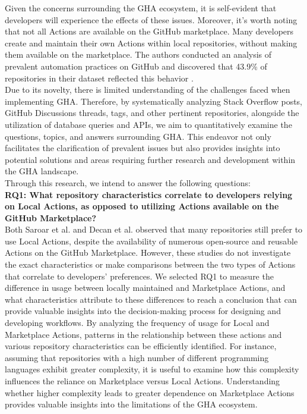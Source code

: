 \documentclass[conference]{IEEEtran}
\begin{document}
    Given the concerns surrounding the GHA ecosystem, it is self-evident that developers will experience the effects of these issues.  Moreover, it's worth noting that not all Actions are available on the GitHub marketplace. Many developers create and maintain their own Actions within local repositories, without making them available on the marketplace. The authors  conducted an analysis of prevalent automation practices on GitHub and discovered that 43.9\% of repositories in their dataset reflected this behavior \cite{decan2022use}.\\
    Due to its novelty, there is limited understanding of the challenges faced when implementing GHA.  
    Therefore,  by systematically analyzing Stack Overflow posts, GitHub Discussions threads, tags, and other pertinent repositories, alongside the utilization of database queries and APIs, we aim to quantitatively examine the questions, topics, and answers surrounding GHA. This endeavor not only facilitates the clarification of prevalent issues but also provides insights into potential solutions and areas requiring further research and development within the GHA landscape.\\

    Through this research, we intend to answer the following questions:\\

    \textbf{RQ1: What repository characteristics correlate to developers relying on Local Actions, as opposed to utilizing Actions available on the GitHub Marketplace?}\\

    Both Saroar et al. \cite{saroar2023developers} and Decan et al. \cite{decan2022use} observed that many repositories still prefer to use Local Actions, despite the availability of numerous open-source and reusable Actions on the GitHub Marketplace. However, these studies do not investigate the exact characteristics or make comparisons between the two types of Actions that correlate to developers' preferences. We selected RQ1 to measure the difference in usage between locally maintained and Marketplace Actions, and what characteristics attribute to these differences to reach a conclusion that can provide valuable insights into the decision-making process for designing and developing workflows.
    By analyzing the frequency of usage for Local and Marketplace Actions, patterns in the relationship between these actions and various repository characteristics can be efficiently identified. For instance, assuming that repositories with a high number of different programming languages exhibit greater complexity, it is useful to examine how this complexity influences the reliance on Marketplace versus Local Actions. Understanding whether higher complexity leads to greater dependence on Marketplace Actions provides valuable insights into the limitations of the GHA ecosystem. \\
\end{document}

